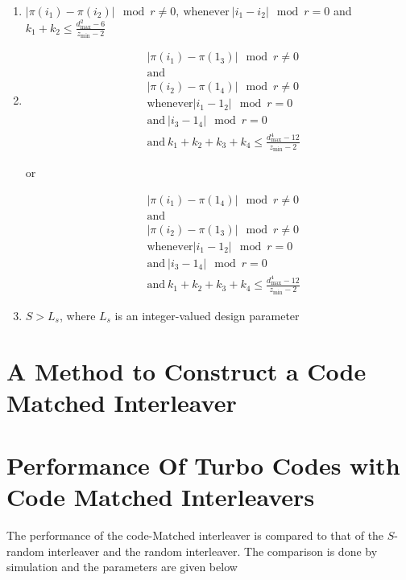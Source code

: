 \documentclass[11pt, oneside, dvipdfmx]{book}
\begin{document}
\begin{enumerate}
\item $|\pi(i_1) - \pi(i_2)| \mod r \neq 0 ,~\text{whenever}~ |i_1 -i_2| \mod r =0 $ and $k_1+k_2  \leq \frac{d^2_{\text{max}}-6}{z_{\min}-2}$

\item \begin{equation*}
   \begin{split}
 	&|\pi(i_1)-\pi(1_3)| \mod r \neq 0\\
 	&\text{and}\\
     &|\pi(i_2)-\pi(1_4)| \mod r \neq 0 \\
     &\text{whenever}
      |i_1-1_2| \mod r =0 \\
      &\text{and}~ |i_3-1_4| \mod r =0\\
       &\text{and} ~ k_1+k_2+k_3+k_4  \leq \frac{d^4_{\text{max}}-12}{z_{\min}-2}
      \end{split}
\end{equation*}

or

\begin{equation*}
   \begin{split}
 	&|\pi(i_1)-\pi(1_4)| \mod r \neq 0\\
 	&\text{and}\\
     &|\pi(i_2)-\pi(1_3)| \mod r \neq 0 \\
     &\text{whenever}
      |i_1-1_2| \mod r =0 \\
      &\text{and}~ |i_3-1_4| \mod r =0\\
       &\text{and} ~ k_1+k_2+k_3+k_4  \leq \frac{d^4_{\text{max}}-12}{z_{\min}-2}
      \end{split}
\end{equation*} 

\item $S > L_s$, where $L_s$ is an integer-valued design parameter

\end{enumerate}

\section{A Method to Construct a Code Matched Interleaver}

\section{Performance Of Turbo Codes with Code Matched Interleavers}
The performance of the code-Matched interleaver is compared to that of the $S$-random interleaver and the  random interleaver. The comparison is done by simulation and the parameters are given below
\end{document}
